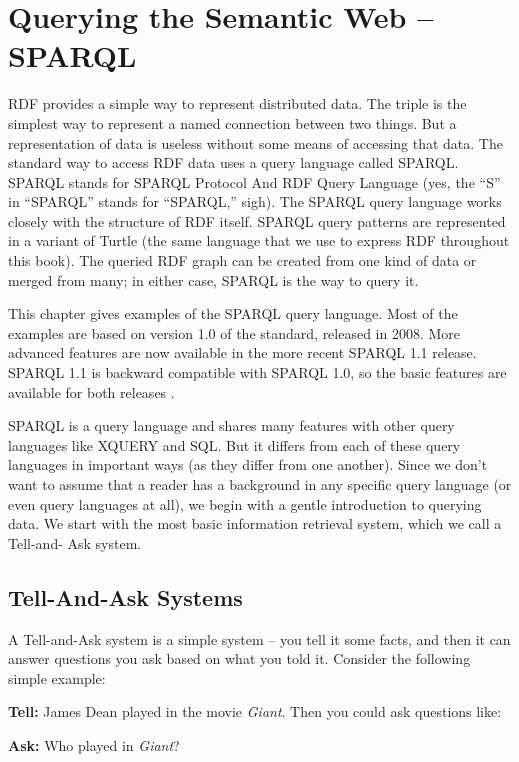\chapter{Querying the Semantic Web -- SPARQL}
\label{ch6}

RDF provides a simple way to represent distributed data. The triple is
the simplest way to represent a named connection between two things. But
a representation of data is useless without some means of accessing that
data. The standard way to access RDF data uses a query language called
SPARQL. SPARQL stands for SPARQL Protocol And RDF Query Language (yes,
the ``S'' in ``SPARQL'' stands for ``SPARQL,'' sigh). The SPARQL query
language works closely with the structure of RDF itself. SPARQL query
patterns are represented in a variant of Turtle (the same language that
we use to express RDF throughout this book). The queried RDF graph can be created from one
kind of data or merged from many; in either case, SPARQL is the way to
query it.

This chapter gives examples of the SPARQL query language. Most of the
examples are based on version 1.0 of the standard, released in 2008. More advanced features 
are now available in the more recent SPARQL 1.1 release.  SPARQL 1.1 is backward compatible with
SPARQL 1.0, so the basic features are available for both releases \cite{Harris:13:SQL}. 

SPARQL is a query language and shares many features with other query
languages like XQUERY and SQL. But it differs from each of these query
languages in important ways (as they differ from one another). Since we
don't want to assume that a reader has a background in any specific
query language (or even query languages at all), we begin with a gentle
introduction to querying data. We start with the most basic information
retrieval system, which we call a Tell-and- Ask system.

\section{Tell-And-Ask Systems}

A Tell-and-Ask system is a simple system -- you tell it some facts, and
then it can answer questions you ask based on what you told it. Consider the following simple example:

\textbf{Tell:} James Dean played in the movie \emph{Giant}. Then you could ask
questions like:

\textbf{Ask:} Who played in \emph{Giant}?

